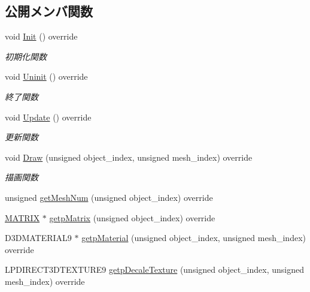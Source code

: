 \subsection*{公開メンバ関数}
\begin{DoxyCompactItemize}
\item 
void \mbox{\hyperlink{class_tutorial_logo_draw_a53fc4b1b23c7f9e249600be67510f944}{Init}} () override
\begin{DoxyCompactList}\small\item\em 初期化関数 \end{DoxyCompactList}\item 
void \mbox{\hyperlink{class_tutorial_logo_draw_a949fb70954e3df28f87b8ed5c61bf8f1}{Uninit}} () override
\begin{DoxyCompactList}\small\item\em 終了関数 \end{DoxyCompactList}\item 
void \mbox{\hyperlink{class_tutorial_logo_draw_af69405fcc8b20684a19e982726d93ffa}{Update}} () override
\begin{DoxyCompactList}\small\item\em 更新関数 \end{DoxyCompactList}\item 
void \mbox{\hyperlink{class_tutorial_logo_draw_aa808cfb8bc59d58bbd698a195603429f}{Draw}} (unsigned object\+\_\+index, unsigned mesh\+\_\+index) override
\begin{DoxyCompactList}\small\item\em 描画関数 \end{DoxyCompactList}\item 
unsigned \mbox{\hyperlink{class_tutorial_logo_draw_a0e56784e25f1f83e6ff167280b801aad}{get\+Mesh\+Num}} (unsigned object\+\_\+index) override
\item 
\mbox{\hyperlink{_vector3_d_8h_a032295cd9fb1b711757c90667278e744}{M\+A\+T\+R\+IX}} $\ast$ \mbox{\hyperlink{class_tutorial_logo_draw_aade531190180c385c266f5698f99735d}{getp\+Matrix}} (unsigned object\+\_\+index) override
\item 
D3\+D\+M\+A\+T\+E\+R\+I\+A\+L9 $\ast$ \mbox{\hyperlink{class_tutorial_logo_draw_acbd9aefdbd4450188e561fb5e5dcd64f}{getp\+Material}} (unsigned object\+\_\+index, unsigned mesh\+\_\+index) override
\item 
L\+P\+D\+I\+R\+E\+C\+T3\+D\+T\+E\+X\+T\+U\+R\+E9 \mbox{\hyperlink{class_tutorial_logo_draw_abf06755b745dc62341a817a58d377659}{getp\+Decale\+Texture}} (unsigned object\+\_\+index, unsigned mesh\+\_\+index) override
\end{DoxyCompactItemize}
